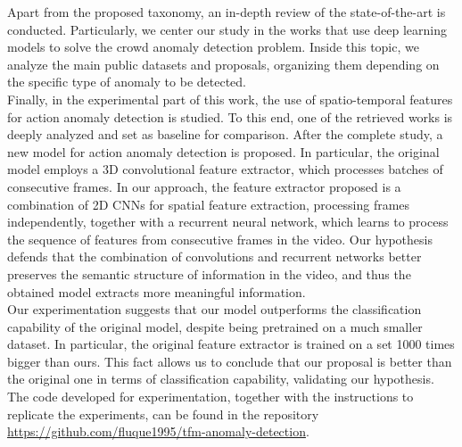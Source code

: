Apart from the proposed taxonomy, an in-depth review of the
state-of-the-art is conducted. Particularly, we center our study in
the works that use deep learning models to solve the crowd anomaly
detection problem. Inside this topic, we analyze the main public
datasets and proposals, organizing them depending on the specific type
of anomaly to be detected.\\

Finally, in the experimental part of this work, the use of
spatio-temporal features for action anomaly detection is studied. To
this end, one of the retrieved works is deeply analyzed and set as
baseline for comparison. After the complete study, a new model for
action anomaly detection is proposed. In particular, the original
model employs a 3D convolutional feature extractor, which processes
batches of consecutive frames. In our approach, the feature extractor
proposed is a combination of 2D CNNs for spatial feature extraction,
processing frames independently, together with a recurrent neural
network, which learns to process the sequence of features from
consecutive frames in the video. Our hypothesis defends that the
combination of convolutions and recurrent networks better preserves
the semantic structure of information in the video, and thus the
obtained model extracts more meaningful information.\\

Our experimentation suggests that our model outperforms the
classification capability of the original model, despite being
pretrained on a much smaller dataset. In particular, the original
feature extractor is trained on a set 1000 times bigger than ours.
This fact allows us to conclude that our proposal is better than
the original one in terms of classification capability, validating
our hypothesis.\\

The code developed for experimentation, together with the instructions
to replicate the experiments, can be found in the repository
\url{https://github.com/fluque1995/tfm-anomaly-detection}.

\newpage